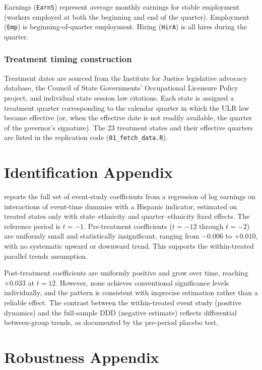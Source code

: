\documentclass[12pt]{article}
\begin{document}
Earnings (\texttt{EarnS}) represent average monthly earnings for stable employment (workers employed at both the beginning and end of the quarter). Employment (\texttt{Emp}) is beginning-of-quarter employment. Hiring (\texttt{HirA}) is all hires during the quarter.

\subsubsection*{Treatment timing construction} Treatment dates are sourced from the Institute for Justice legislative advocacy database, the Council of State Governments' Occupational Licensure Policy project, and individual state session law citations. Each state is assigned a treatment quarter corresponding to the calendar quarter in which the ULR law became effective (or, when the effective date is not readily available, the quarter of the governor's signature). The 23 treatment states and their effective quarters are listed in the replication code (\texttt{01\_fetch\_data.R}).

\section{Identification Appendix}
\label{app:id}



 reports the full set of event-study coefficients from a regression of log earnings on interactions of event-time dummies with a Hispanic indicator, estimated on treated states only with state--ethnicity and quarter--ethnicity fixed effects. The reference period is $t = -1$. Pre-treatment coefficients ($t = -12$ through $t = -2$) are uniformly small and statistically insignificant, ranging from $-0.006$ to $+0.010$, with no systematic upward or downward trend. This supports the within-treated parallel trends assumption.

Post-treatment coefficients are uniformly positive and grow over time, reaching $+0.033$ at $t = 12$. However, none achieves conventional significance levels individually, and the pattern is consistent with imprecise estimation rather than a reliable effect. The contrast between the within-treated event study (positive dynamics) and the full-sample DDD (negative estimate) reflects differential between-group trends, as documented by the pre-period placebo test.

\section{Robustness Appendix}
\label{app:robust}
\end{document}
